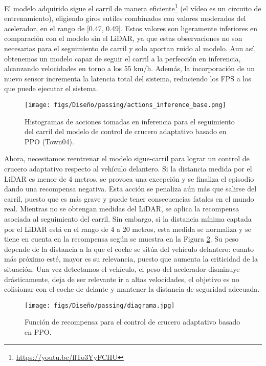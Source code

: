 El modelo adquirido sigue el carril de manera eficiente\footnote{\url{https://youtu.be/flTo3YyFCHU}} (el vídeo es un circuito de entrenamiento), eligiendo giros sutiles combinados con valores moderados del acelerador, en el rango de [0.47, 0.49]. Estos valores son ligeramente inferiores en comparación con el modelo sin el \ac{LiDAR}, ya que estas observaciones no son necesarias para el seguimiento de carril y solo aportan ruido al modelo. Aun así, obtenemos un modelo capaz de seguir el carril a la perfección en inferencia, alcanzando velocidades en torno a los 55 km/h. Además, la incorporación de un nuevo sensor incrementa la latencia total del sistema, reduciendo los \ac{FPS} a los que puede ejecutar el sistema.
\begin{figure}[ht]
\centering
\texttt{[image: figs/Diseño/passing/actions\_inference\_base.png]}
\caption{Histogramas de acciones tomadas en inferencia para el seguimiento del carril del modelo de control de crucero adaptativo basado en \ac{PPO} (Town04).}
\label{fig:passing_inference_lane}
\end{figure}

\newpage

Ahora, necesitamos reentrenar el modelo sigue-carril para lograr un control de crucero adaptativo respecto al vehículo delantero. Si la distancia medida por el \ac{LiDAR} es menor de 4 metros, se provoca una excepción y se finaliza el episodio dando una recompensa negativa. Esta acción se penaliza aún más que salirse del carril, puesto que es más grave y puede tener consecuencias fatales en el mundo real. Mientras no se obtengan medidas del \ac{LiDAR}, se aplica la recompensa asociada al seguimiento del carril. Sin embargo, si la distancia mínima captada por el \ac{LiDAR} está en el rango de 4 a 20 metros, esta medida se normaliza y se tiene en cuenta en la recompensa según se muestra en la Figura \ref{fig:diagrama_lidar}. Su peso depende de la distancia a la que el coche se sitúa del vehículo delantero: cuanto más próximo esté, mayor es su relevancia, puesto que aumenta la criticidad de la situación. Una vez detectamos el vehículo, el peso del acelerador disminuye drásticamente, deja de ser relevante ir a altas velocidades, el objetivo es no colisionar con el coche de delante y mantener la distancia de seguridad adecuada.

\begin{figure}[ht]
\centering
\texttt{[image: figs/Diseño/passing/diagrama.jpg]}
\caption{Función de recompensa para el control de crucero adaptativo basado en \ac{PPO}.} \label{fig:diagrama_lidar}
\end{figure}

